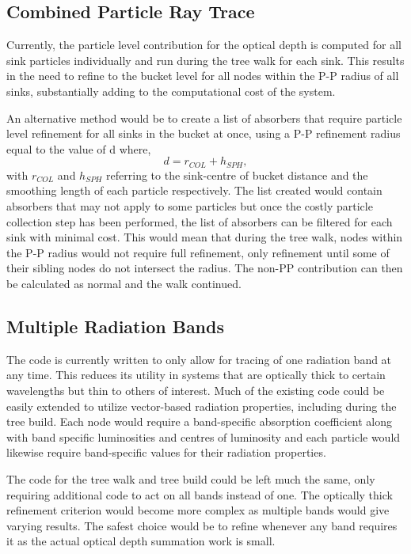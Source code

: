 \subsection{Combined Particle Ray Trace}

Currently, the particle level contribution for the optical depth is computed for all sink particles individually and run during the tree walk for each sink. This results in the need to refine to the bucket level for all nodes within the P-P radius of all sinks, substantially adding to the computational cost of the system.

An alternative method would be to create a list of absorbers that require particle level refinement for all sinks in the bucket at once, using a P-P refinement radius equal to the value of d where,
\begin{equation}
    d = r_{COL}+h_{SPH},
\end{equation}
with $r_{COL}$ and $h_{SPH}$ referring to the sink-centre of bucket distance and the smoothing length of each particle respectively. The list created would contain absorbers that may not apply to some particles but once the costly particle collection step has been performed, the list of absorbers can be filtered for each sink with minimal cost. This would mean that during the tree walk, nodes within the P-P radius would not require full refinement, only refinement until some of their sibling nodes do not intersect the radius. The non-PP contribution can then be calculated as normal and the walk continued.

\subsection{Multiple Radiation Bands}

The code is currently written to only allow for tracing of one radiation band at any time. This reduces its utility in systems that are optically thick to certain wavelengths but thin to others of interest. Much of the existing code could be easily extended to utilize vector-based radiation properties, including during the tree build. Each node would require a band-specific absorption coefficient along with band specific luminosities and centres of luminosity and each particle would likewise require band-specific values for their radiation properties.

The code for the tree walk and tree build could be left much the same, only requiring additional code to act on all bands instead of one. The optically thick refinement criterion would become more complex as multiple bands would give varying results. The safest choice would be to refine whenever any band requires it as the actual optical depth summation work is small.

